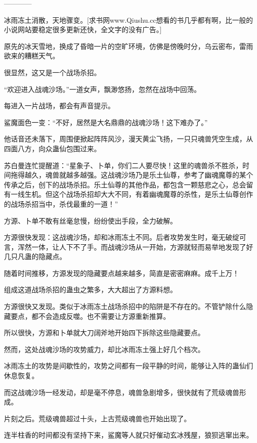
\begin{this_body}

------------

冰雨冻土消散，天地骤变。[求书网www.Qiushu.cc想看的书几乎都有啊，比一般的小说网站要稳定很多更新还快，全文字的没有广告。]

原先的冰天雪地，换成了昏暗一片的空旷环境，仿佛是傍晚时分，乌云密布，雷雨欲来的糟糕天气。

很显然，这又是一个战场杀招。

“欢迎进入战魂沙场。”一道女声，飘渺悠扬，忽然在战场中回荡。

每进入一片战场，都会有声音提示。

鲨魔面色一变：“不好，居然是大名鼎鼎的战魂沙场！这下难办了。”

他话音还未落下，周围便掀起阵阵风沙，漫天黄尘飞扬，一只只魂兽凭空生成，从四面八方，向众蛊仙包围过来。

苏白曼连忙提醒道：“星象子、卜单，你们二人要尽快！这里的魂兽杀不胜杀，时间拖得越久，魂兽就越多越强。这战魂沙场乃是乐土仙尊，参考了幽魂魔尊的某个传承之后，创下的战场杀招。乐土仙尊的其他作品，都包含一颗慈悲之心，总会留有一线生机。但这个战场杀招却大大不同，有着幽魂魔尊的杀性，是乐土仙尊创作的战场杀招当中，杀伐最重的一道！”

方源、卜单不敢有丝毫怠慢，纷纷使出手段，全力破解。

方源很快发现：这战魂沙场，却和冰雨冻土不同。后者攻势发生时，毫无破绽可言，浑然一体，让人下不了手。而战魂沙场从一开始，方源就轻而易举地发现了好几只凡蛊的隐藏点。

随着时间推移，方源发现的隐藏要点越来越多，简直是密密麻麻。成千上万！

组成这道战场杀招的蛊虫之繁多，大大超出了方源料想。

方源很快又发现。类似于冰雨冻土战场杀招中的陷阱是不存在的。不管铲除什么隐藏要点，都不会造成反噬。也不需要让方源重新推算。

所以很快，方源和卜单就大刀阔斧地开始四下拆除这些隐藏要点。

然而，这处战魂沙场的攻势威力，却比冰雨冻土强上好几个档次。

冰雨冻土的攻势是间歇性的，攻势之间都有一段平静的时间，能够让入阵的蛊仙们休息恢复。

而这战魂沙场一经发动，却是毫不停息，魂兽急剧增多，很快就有了荒级魂兽形成。

片刻之后。荒级魂兽超过十头，上古荒级魂兽也开始出现了。

连半柱香的时间都没有坚持下来，鲨魔等人就只好催动玄冰残屋，狼狈逃窜出来。


\end{this_body}
